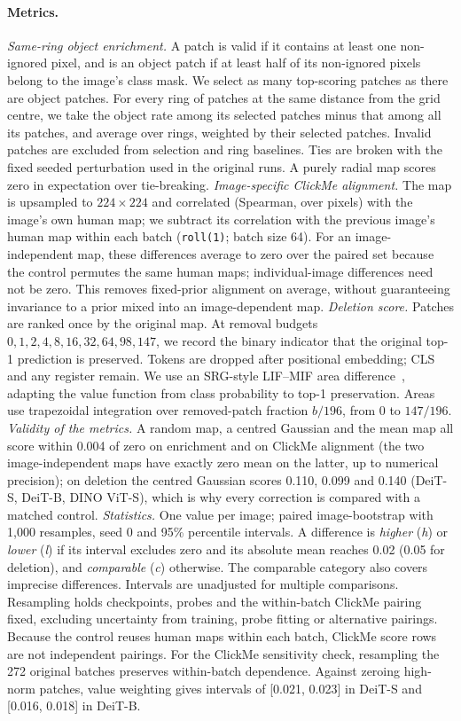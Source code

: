 \paragraph{Metrics.} \emph{Same-ring object enrichment.} A patch is valid if it contains at least one non-ignored pixel, and is an object patch if at least half of its non-ignored pixels belong to the image's class mask. We select as many top-scoring patches as there are object patches. For every ring of patches at the same distance from the grid centre, we take the object rate among its selected patches minus that among all its patches, and average over rings, weighted by their selected patches. Invalid patches are excluded from selection and ring baselines. Ties are broken with the fixed seeded perturbation used in the original runs. A purely radial map scores zero in expectation over tie-breaking.
\emph{Image-specific ClickMe alignment.} The map is upsampled to $224{\times}224$ and correlated (Spearman, over pixels) with the image's own human map; we subtract its correlation with the previous image's human map within each batch (\texttt{roll(1)}; batch size 64). For an image-independent map, these differences average to zero over the paired set because the control permutes the same human maps; individual-image differences need not be zero. This removes fixed-prior alignment on average, without guaranteeing invariance to a prior mixed into an image-dependent map.
\emph{Deletion score.} Patches are ranked once by the original map. At removal budgets $0,1,2,4,8,16,32,64,98,147$, we record the binary indicator that the original top-1 prediction is preserved. Tokens are dropped after positional embedding; CLS and any register remain. We use an SRG-style LIF--MIF area difference~\citep{bluecher2024}, adapting the value function from class probability to top-1 preservation. Areas use trapezoidal integration over removed-patch fraction $b/196$, from 0 to $147/196$.
\emph{Validity of the metrics.} A random map, a centred Gaussian and the mean map all score within 0.004 of zero on enrichment and on ClickMe alignment (the two image-independent maps have exactly zero mean on the latter, up to numerical precision); on deletion the centred Gaussian scores 0.110, 0.099 and 0.140 (DeiT-S, DeiT-B, DINO ViT-S), which is why every correction is compared with a matched control.
\emph{Statistics.} One value per image; paired image-bootstrap with 1,000 resamples, seed 0 and 95\% percentile intervals. A difference is \emph{higher} (\textit{h}) or \emph{lower} (\textit{l}) if its interval excludes zero and its absolute mean reaches 0.02 (0.05 for deletion), and \emph{comparable} (\textit{c}) otherwise. The comparable category also covers imprecise differences. Intervals are unadjusted for multiple comparisons. Resampling holds checkpoints, probes and the within-batch ClickMe pairing fixed, excluding uncertainty from training, probe fitting or alternative pairings. Because the control reuses human maps within each batch, ClickMe score rows are not independent pairings. For the ClickMe sensitivity check, resampling the 272 original batches preserves within-batch dependence. Against zeroing high-norm patches, value weighting gives intervals of [0.021, 0.023] in DeiT-S and [0.016, 0.018] in DeiT-B.

